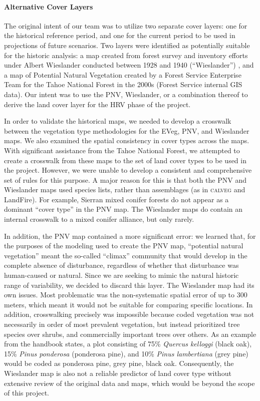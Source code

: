 \paragraph{Alternative Cover Layers}
The original intent of our team was to utilize two separate cover layers: one for the historical reference period, and one for the current period to be used in projections of future scenarios. Two layers were identified as potentially suitable for the historic analysis: a map created from forest survey and inventory efforts under Albert Wieslander conducted between 1928 and 1940 (``Wieslander'') \citep{Thorne2006}, and a map of Potential Natural Vegetation created by a Forest Service Enterprise Team for the Tahoe National Forest in the 2000s (Forest Service internal GIS data). Our intent was to use the PNV, Wieslander, or a combination thereof to derive the land cover layer for the HRV phase of the project. 

In order to validate the historical maps, we needed to develop a crosswalk between the vegetation type methodologies for the EVeg, PNV, and Wieslander maps. We also examined the spatial consistency in cover types across the maps. With significant assistance from the Tahoe National Forest, we attempted to create a crosswalk from these maps to the set of land cover types to be used in the project. However, we were unable to develop a consistent and comprehensive set of rules for this purpose. A major reason for this is that both the PNV and Wieslander maps used species lists, rather than assemblages (as in \textsc{calveg} and LandFire). For example, Sierran mixed conifer forests do not appear as a dominant ``cover type'' in the PNV map. The Wieslander maps do contain an internal crosswalk to a mixed conifer alliance, but only rarely. 

In addition, the PNV map contained a more significant error: we learned that, for the purposes of the modeling used to create the PNV map, ``potential natural vegetation'' meant the so-called ``climax'' community that would develop in the complete absence of disturbance, regardless of whether that disturbance was human-caused or natural. Since we are seeking to mimic the natural historic range of variability, we decided to discard this layer. The Wieslander map had its own issues. Most problematic was the non-systematic spatial error of up to 300 meters, which meant it would not be suitable for comparing specific locations. In addition, crosswalking precisely was impossible because coded vegetation was not necessarily in order of most prevalent vegetation, but instead prioritized tree species over shrubs, and commercially important trees over others. As an example from the handbook states, a plot consisting of 75\% \emph{Quercus kelloggi} (black oak), 15\% \emph{Pinus ponderosa} (ponderosa pine), and 10\% \emph{Pinus lambertiana} (grey pine) would be coded as ponderosa pine, grey pine, black oak. Consequently, the Wieslander map is also not a reliable predictor of land cover type without extensive review of the original data and maps, which would be beyond the scope of this project. 

